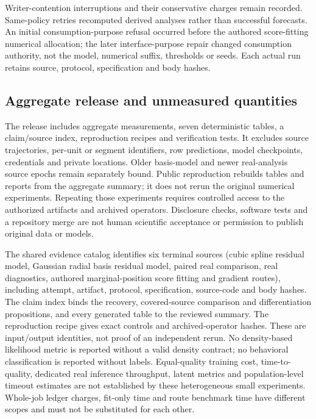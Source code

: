 \documentclass[11pt]{article}
\begin{document}
Writer-contention interruptions and their conservative charges remain recorded. Same-policy retries recomputed derived analyses rather than successful forecasts. An initial consumption-purpose refusal occurred before the authored score-fitting numerical allocation; the later interface-purpose repair changed consumption authority, not the model, numerical suffix, thresholds or seeds. Each actual run retains source, protocol, specification and body hashes.

\subsection{Aggregate release and unmeasured quantities}
The release includes aggregate measurements, seven deterministic tables, a claim/source index, reproduction recipes and verification tests. It excludes source trajectories, per-unit or segment identifiers, row predictions, model checkpoints, credentials and private locations. Older basis-model and newer real-analysis source epochs remain separately bound. Public reproduction rebuilds tables and reports from the aggregate summary; it does not rerun the original numerical experiments. Repeating those experiments requires controlled access to the authorized artifacts and archived operators. Disclosure checks, software tests and a repository merge are not human scientific acceptance or permission to publish original data or models.

The shared evidence catalog identifies six terminal sources (cubic spline residual model, Gaussian radial basis residual model, paired real comparison, real diagnostics, authored marginal-position score fitting and gradient routes), including attempt, artifact, protocol, specification, source-code and body hashes. The claim index binds the recovery, covered-source comparison and differentiation propositions, and every generated table to the reviewed summary. The reproduction recipe gives exact controls and archived-operator hashes. These are input/output identities, not proof of an independent rerun. No density-based likelihood metric is reported without a valid density contract; no behavioral classification is reported without labels. Equal-quality training cost, time-to-quality, dedicated real inference throughput, latent metrics and population-level timeout estimates are not established by these heterogeneous small experiments. Whole-job ledger charges, fit-only time and route benchmark time have different scopes and must not be substituted for each other.
\end{document}
